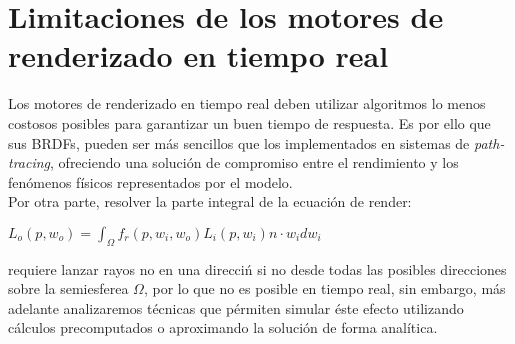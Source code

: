     \section{Limitaciones de los motores de renderizado en tiempo real}
    Los motores de renderizado en tiempo real deben utilizar algoritmos lo menos costosos posibles para garantizar un buen
    tiempo de respuesta. Es por ello que sus BRDFs, pueden ser m\'as sencillos que los implementados en sistemas de \textit{path-tracing},
    ofreciendo una soluci\'on de compromiso entre el rendimiento y los fen\'omenos f\'isicos representados por el modelo.\\
    
    Por otra parte, resolver la parte integral de la ecuaci\'on de render:

    \begin{center}$L_o(p, w_o) = \int_{\Omega} f_r(p, w_i, w_o)L_i(p, w_i)n\cdot{w_i}dw_i$\end{center}
    \singlespacing
    requiere lanzar rayos no en una direcci\'n si no desde todas las posibles direcciones sobre la semiesferea $\Omega$, por
    lo que no es posible en tiempo real, sin embargo, m\'as adelante analizaremos t\'ecnicas que p\'ermiten simular \'este
    efecto utilizando c\'alculos precomputados o aproximando la soluci\'on de forma anal\'itica.\\


